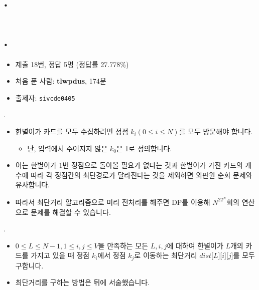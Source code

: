 \section{\probidx. \probname}


	
	\section{\probidx. \probname}
	
	\begin{frame} %
		\sectiontitle{\probidx}{\probname}
		\begin{itemize}
			\item 제출 18번, 정답 5명 (정답률 27.778\%)
			\item 처음 푼 사람: \textbf{tlwpdus}, 174분
			\item 출제자: \texttt{sivcde0405}
		\end{itemize}
	\end{frame}
	
	\begin{frame}{\textbf{\probidx}. \probname}
		\begin{itemize}
			\item 한별이가 카드를 모두 수집하려면 정점 $k_i (0 \leq i \leq N)$를 모두 방문해야 합니다.
			\begin{itemize}
				\item 단, 입력에서 주어지지 않은 $k_0$은 1로 정의합니다.
			\end{itemize}
			\item 이는 한별이가 $1$번 정점으로 돌아올 필요가 없다는 것과 한별이가 가진 카드의 개수에 따라 각 정점간의 최단경로가 달라진다는 것을 제외하면 외판원 순회 문제와 유사합니다.
			\item 따라서 최단거리 알고리즘으로 미리 전처리를 해주면 DP를 이용해 $N^22^N$회의 연산으로 문제를 해결할 수 있습니다.
		\end{itemize}
	\end{frame}
	
	\begin{frame}{\textbf{\probidx}. \probname}
		\begin{itemize}
			\item $0 \leq L \leq N-1, 1\leq i,j \leq V$을 만족하는 모든 $L, i, j$에 대하여 한별이가 $L$개의 카드를 가지고 있을 때 정점 $k_i$에서 정점 $k_j$로 이동하는 최단거리 $dist$[$L$][$i$][$j$]를 모두 구합니다.
			\item 최단거리를 구하는 방법은 뒤에 서술했습니다.
		\end{itemize}
	\end{frame}
	
